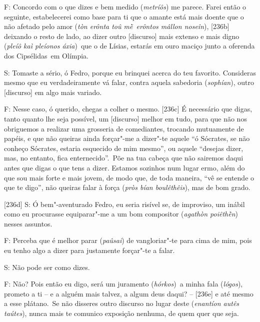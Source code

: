  

F: Concordo com o que dizes e bem medido (\emph{metríôs}) me parece.
Farei então o seguinte, estabelecerei como base para ti que o amante
está mais doente que o não afetado pelo amor (\emph{tòn erônta toû
mḕ~erôntos mâllon noseîn}), [236b] deixando o resto de lado, ao
dizer outro [discurso] mais extenso e mais digno (\emph{pleíô kaì
pleíonos áxia})~que o de Lísias, estarás em ouro maciço junto a oferenda
dos Cipsélidas~em Olímpia.

 

S: Tomaste a sério, ó Fedro, porque eu brinquei acerca do teu favorito.
Consideras mesmo que eu verdadeiramente vá falar, contra aquela
sabedoria (\emph{sophían}), outro [discurso] em algo mais variado.

 

F: Nesse caso, ó querido, chegas a colher o mesmo. [236c] É
necessário que digas, tanto quanto lhe seja possível, um [discurso]
melhor em tudo, para que não nos obriguemos a realizar uma grosseria de
comediantes, trocando mutuamente de papéis, e que não queiras ainda
forçar"-me a dizer"-te aquele ``ó Sócrates, se não conheço Sócrates,
estaria esquecido de mim mesmo'', ou aquele ``desejas dizer, mas, no
entanto, fica enternecido''.~Põe na tua cabeça que não sairemos daqui
antes que digas o que tens a dizer. Estamos sozinhos num lugar ermo,
além do que sou mais forte e mais jovem, de modo que, de toda maneira,
``vê se entende o que te digo'', não queiras falar à força (\emph{pròs
bían boulêthêis}), mas de bom grado.

 

[236d] S: Ó bem"-aventurado Fedro, eu seria risível se, de improviso,
um inábil como eu procurasse equiparar"-me a um bom compositor
(\emph{agathòn poiêthḕn}) nesses assuntos.

 

F: Perceba que é melhor parar (\emph{paûsai}) de vangloriar"-te para cima
de mim, pois eu tenho algo a dizer para justamente forçar"-te a falar.

 

S: Não pode ser como dizes.

 

F: Não? Pois então eu digo, será um juramento (\emph{hórkos})\emph{~}a
minha fala (\emph{lógos}), prometo a ti -- e a alguém mais talvez, a
algum deus daqui? -- [236e] e até mesmo a esse plátano.~Se não
disseres outro discurso no lugar deste (\emph{enantíon autês taútes}),
nunca mais te comunico exposição nenhuma, de quem quer que seja.

